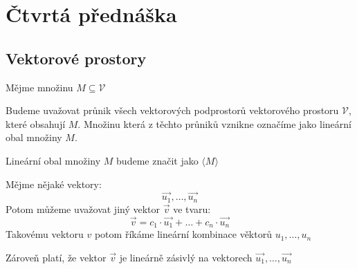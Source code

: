 \section{Čtvrtá přednáška}
\subsection{Vektorové prostory}

\begin{definition}
    Mějme množinu $M \subseteq \mathcal{V}$

    Budeme uvažovat průnik všech vektorových podprostorů vektorového prostoru $\mathcal{V}$,
    které obsahují $M$. Množinu která z těchto průniků vznikne označíme jako lineární obal
    množiny $M$.

    Lineární obal množiny $M$ budeme značit jako $\langle M \rangle$
\end{definition}

\begin{definition}
    Mějme nějaké vektory:
    $$\vec{u_1}, \ldots, \vec{u_n}$$
    Potom můžeme uvažovat jiný vektor $\vec{v}$ ve tvaru:
    $$\vec{v} = c_1 \cdot \vec{u_1} + \ldots + c_n \cdot \vec{u_n}$$
    Takovému vektoru $v$ potom říkáme lineární kombinace věktorů $u_1, \ldots, u_n$

    Zároveň platí, že vektor $\vec{v}$ je lineárně zásivlý na vektorech
        $\vec{u_1}, \ldots, \vec{u_n}$
\end{definition}

